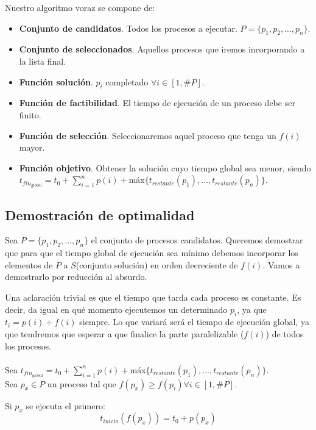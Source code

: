 \documentclass[12pt,spanish]{article}
\begin{document}
Nuestro algoritmo voraz se compone de:
\begin{itemize}
	\item \textbf{Conjunto de candidatos}. Todos los procesos a ejecutar. $P=\{p_1, p_2, ..., p_n\}$.
	\item \textbf{Conjunto de seleccionados}. Aquellos procesos que iremos incorporando a la lista final.
	\item \textbf{Función solución}. $p_i$ completado $\forall i \in [1,\#P]$.
	\item \textbf{Función de factibilidad}. El tiempo de ejecución de un proceso debe ser finito.
	\item \textbf{Función de selección}. Seleccionaremos aquel proceso que tenga un $f(i)$ mayor.
	\item \textbf{Función objetivo}. Obtener la solución cuyo tiempo global sea menor, siendo $t_{fin_{global}} = t_0 + \sum_{i=1}^{n} p(i) + $máx$\{t_{restante}(p_1),...,t_{restante}(p_n)\}$.
\end{itemize}

\subsection{Demostración de optimalidad}

Sea $P=\{p_1,p_2,...,p_n\}$ el conjunto de procesos candidatos. Queremos demostrar que para que el tiempo global de ejecución sea mínimo debemos incorporar los elementos de $P$ a $S$(conjunto solución) en orden decreciente de $f(i)$. Vamos a demostrarlo por reducción al absurdo.

Una aclaración trivial es que el tiempo que tarda cada proceso es constante. Es decir, da igual en qué momento ejecutemos un determinado $p_i$, ya que $t_i=p(i)+f(i)$ siempre. Lo que variará será el tiempo de ejecución global, ya que tendremos que esperar a que finalice la parte paralelizable ($f(i)$) de todos los procesos.\\\\

Sea $t_{fin_{global}} = t_0 + \sum_{i=1}^{n} p(i) + $máx$\{t_{restante}(p_1),...,t_{restante}(p_n)\}$.\\

Sea $p_x \in P$ un proceso tal que $f(p_x)\geq f(p_i) \forall i \in [1,\#P]$.

Si $p_x$ se ejecuta el primero:\\
\begin{equation*}
	t_{inicio}(f(p_x))= t_0 + p(p_x)
\end{equation*}
\end{document}
